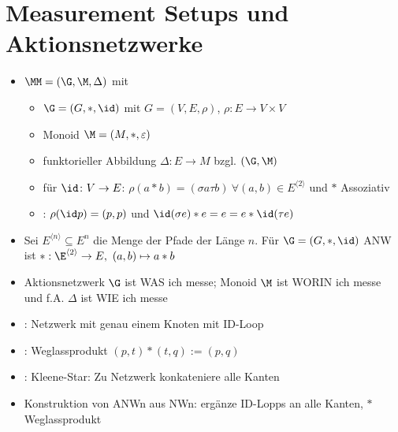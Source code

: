 	\section{Measurement Setups und Aktionsnetzwerke}
	\begin{itemize}
		\item {} $\MM=(\G,\M,\Delta)$ mit
			\begin{itemize}
				\item {} $\G=(G,\ast,\id)$ mit
				 $G=(V,E,\rho)$, $\rho\colon E\to V\times V$
				\item Monoid $\M=(M,\ast,\varepsilon)$
				\item funktorieller Abbildung $\Delta\colon E\to M$ bzgl. $(\G,\M)$
				\item {} für $\id\colon V\to E$: $\rho(a\ast b)=(\sigma a\tau b)~\forall (a,b)\in E^{\langle2\rangle}$ und $\ast$ Assoziativ
				\item {}: $\rho(\id p)=(p,p)$ und $\id(\sigma e)\ast e=e=e\ast\id(\tau e)$
			\end{itemize}
		\item Sei $E^{\langle n\rangle}\subseteq E^n$ die Menge der Pfade der Länge $n$.
		Für $\G=(G,\ast,\id)$ ANW ist $\ast:\E^{\langle2\rangle}\to E,~(a,b)\mapsto a\ast b$
		\item Aktionsnetzwerk $\G$ ist WAS ich messe; Monoid $\M$ ist WORIN ich messe und f.A. $\Delta$ ist WIE ich messe
		\item {}: Netzwerk mit genau einem Knoten mit ID-Loop
		\item {}: Weglassprodukt $(p,t)\ast(t,q):=(p,q)$
		\item {}: Kleene-Star: Zu Netzwerk konkateniere alle Kanten
		\item Konstruktion von ANWn aus NWn: ergänze ID-Lopps an alle Kanten, $\ast$ Weglassprodukt
		

\end{itemize}
